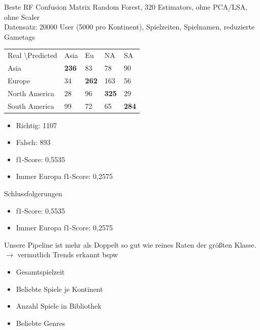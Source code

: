 \documentclass[12pt]{beamer}
\begin{document}
\begin{frame}[fragile]{Beste RF Confusion Matrix}
Random Forest, 320 Estimators, ohne PCA/LSA, ohne Scaler \\
Datensatz: 20000 User (5000 pro Kontinent), Spielzeiten, Spielnamen, reduzierte Gametags \\
\medskip
\begin{tabular}{| l| l| l| l| l|}
\hline
Real \textbackslash Predicted & Asia & Eu & NA & SA \\
Asia & \textbf{236} & 83 & 78 & 90 \\
Europe & 34 & \textbf{262} & 163 & 56 \\
North America & 28 & 96 & \textbf{325} & 29 \\
South America & 99 & 72 & 65 & \textbf{284} \\
\hline
\end{tabular}
\begin{itemize}
\item Richtig: 1107
\item Falsch: 893
\item f1-Score: 0,5535
\item Immer Europa f1-Score: 0,2575
\end{itemize}
\end{frame}

\begin{frame}[fragile]{Schlussfolgerungen}
\begin{itemize}
\item f1-Score: 0,5535
\item Immer Europa f1-Score: 0,2575
\end{itemize}
Unsere Pipeline ist mehr als Doppelt so gut wie reines Raten der größten Klasse. \\
$ \rightarrow $ vermutlich Trends erkannt bspw
\begin{itemize}
\item Gesamtspielzeit
\item Beliebte Spiele je Kontinent
\item Anzahl Spiele in Bibliothek
\item Beliebte Genres
\end{itemize}  

\end{frame}
\end{document}
